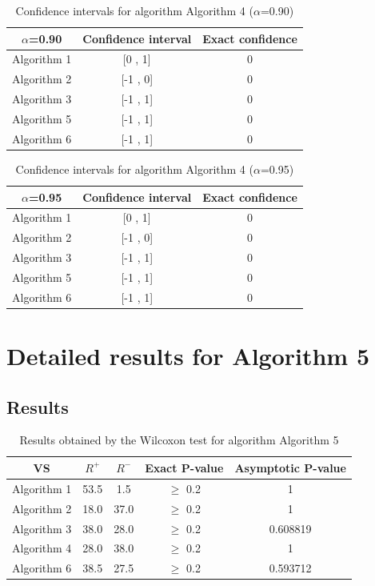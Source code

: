 \documentclass[a4paper,10pt]{article}
\begin{document}
\begin{table}[!htp]
\centering\small
\begin{tabular}{
|c|c|c|}
\hline
 $\alpha$=0.90 & Confidence interval & Exact confidence \\ \hline 
Algorithm 1 & [0 , 1] & 0\\ \hline 
Algorithm 2 & [-1 , 0] & 0\\ \hline 
Algorithm 3 & [-1 , 1] & 0\\ \hline 
Algorithm 5 & [-1 , 1] & 0\\ \hline 
Algorithm 6 & [-1 , 1] & 0\\ \hline 

\end{tabular}
\caption{Confidence intervals for algorithm Algorithm 4 ($\alpha$=0.90)}
\end{table}
\begin{table}[!htp]
\centering\small
\begin{tabular}{
|c|c|c|}
\hline
 $\alpha$=0.95 & Confidence interval & Exact confidence \\ \hline 
Algorithm 1 & [0 , 1] & 0\\ \hline 
Algorithm 2 & [-1 , 0] & 0\\ \hline 
Algorithm 3 & [-1 , 1] & 0\\ \hline 
Algorithm 5 & [-1 , 1] & 0\\ \hline 
Algorithm 6 & [-1 , 1] & 0\\ \hline 

\end{tabular}
\caption{Confidence intervals for algorithm Algorithm 4 ($\alpha$=0.95)}
\end{table}

 \clearpage 


\section{Detailed results for Algorithm 5}


\subsection{Results}

\begin{table}[!htp]
\centering\small
\begin{tabular}{
|c|c|c|c|c|}
\hline
 VS & $R^{+}$ & $R^{-}$ & Exact P-value & Asymptotic P-value \\ \hline 
Algorithm 1 & 53.5 & 1.5 & $\geq$ 0.2 & 1\\ \hline 
Algorithm 2 & 18.0 & 37.0 & $\geq$ 0.2 & 1\\ \hline 
Algorithm 3 & 38.0 & 28.0 & $\geq$ 0.2 & 0.608819\\ \hline 
Algorithm 4 & 28.0 & 38.0 & $\geq$ 0.2 & 1\\ \hline 
Algorithm 6 & 38.5 & 27.5 & $\geq$ 0.2 & 0.593712\\ \hline 

\end{tabular}
\caption{Results obtained by the Wilcoxon test for algorithm Algorithm 5}
\end{table}
\end{document}
